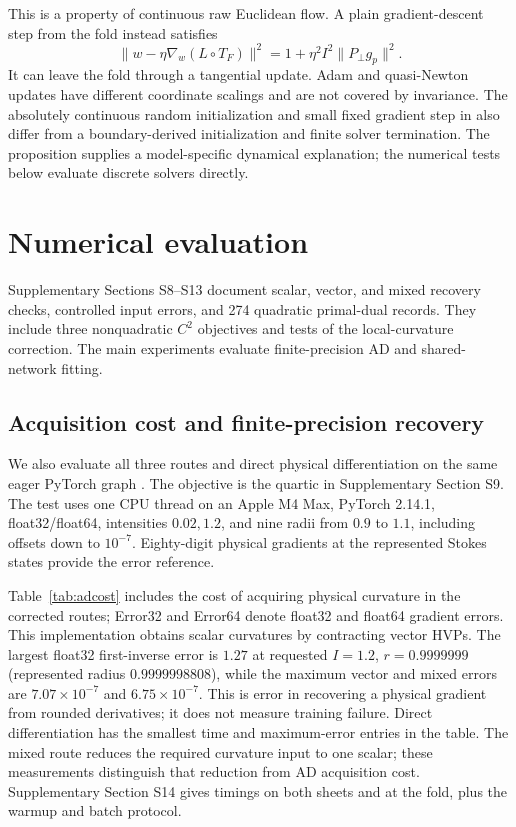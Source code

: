 This is a property of continuous raw Euclidean flow. A plain gradient-descent step from the fold instead satisfies
\begin{equation}
 \|w-\eta\nabla_w(L\circ T_F)\|^2
 =1+\eta^2 I^2\|P_\perp g_p\|^2.
 \label{eq:discretefoldstep}
\end{equation}
It can leave the fold through a tangential update. Adam and quasi-Newton updates have different coordinate scalings and are not covered by invariance. The absolutely continuous random initialization and small fixed gradient step in \cite{lee} also differ from a boundary-derived initialization and finite solver termination. The proposition supplies a model-specific dynamical explanation; the numerical tests below evaluate discrete solvers directly.

\section{Numerical evaluation}
\label{sec:numerics}
Supplementary Sections S8--S13 document scalar, vector, and mixed recovery checks, controlled input errors, and 274 quadratic primal-dual records. They include three nonquadratic $C^2$ objectives and tests of the local-curvature correction. The main experiments evaluate finite-precision AD and shared-network fitting.

\subsection{Acquisition cost and finite-precision recovery}
We also evaluate all three routes and direct physical differentiation on the same eager PyTorch graph \cite{pytorch}. The objective is the quartic in Supplementary Section S9. The test uses one CPU thread on an Apple M4 Max, PyTorch 2.14.1, float32/float64, intensities $0.02,1.2$, and nine radii from $0.9$ to $1.1$, including offsets down to $10^{-7}$. Eighty-digit physical gradients at the represented Stokes states provide the error reference.

Table~\ref{tab:adcost} includes the cost of acquiring physical curvature in the corrected routes; Error32 and Error64 denote float32 and float64 gradient errors. This implementation obtains scalar curvatures by contracting vector HVPs. The largest float32 first-inverse error is $1.27$ at requested $I=1.2$, $r=0.9999999$ (represented radius $0.9999998808$), while the maximum vector and mixed errors are $7.07\times10^{-7}$ and $6.75\times10^{-7}$. This is error in recovering a physical gradient from rounded derivatives; it does not measure training failure. Direct differentiation has the smallest time and maximum-error entries in the table. The mixed route reduces the required curvature input to one scalar; these measurements distinguish that reduction from AD acquisition cost. Supplementary Section S14 gives timings on both sheets and at the fold, plus the warmup and batch protocol.


